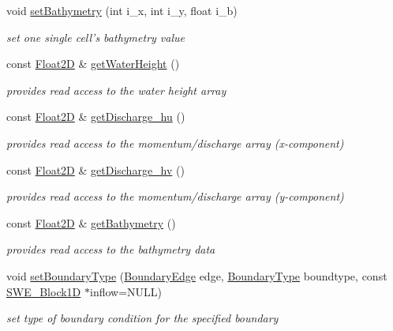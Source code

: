 \begin{DoxyCompactItemize}
void \hyperlink{classSWE__Block_a54d2adb939d59e064edd7316faae445f}{set\-Bathymetry} (int i\-\_\-x, int i\-\_\-y, float i\-\_\-b)
\begin{DoxyCompactList}\small\item\em set one single cell's bathymetry value \end{DoxyCompactList}\item 
const \hyperlink{classFloat2D}{Float2\-D} \& \hyperlink{classSWE__Block_ab1aea4294403c194180c3dc107339fd7}{get\-Water\-Height} ()
\begin{DoxyCompactList}\small\item\em provides read access to the water height array \end{DoxyCompactList}\item 
const \hyperlink{classFloat2D}{Float2\-D} \& \hyperlink{classSWE__Block_ae5e766626a1e3fee89625610e2c67f1f}{get\-Discharge\-\_\-hu} ()
\begin{DoxyCompactList}\small\item\em provides read access to the momentum/discharge array (x-\/component) \end{DoxyCompactList}\item 
const \hyperlink{classFloat2D}{Float2\-D} \& \hyperlink{classSWE__Block_aece9e8dc3f9b8ab27420e537c76daf7c}{get\-Discharge\-\_\-hv} ()
\begin{DoxyCompactList}\small\item\em provides read access to the momentum/discharge array (y-\/component) \end{DoxyCompactList}\item 
const \hyperlink{classFloat2D}{Float2\-D} \& \hyperlink{classSWE__Block_a98e2c99a335d11d09a1489d6873b5615}{get\-Bathymetry} ()
\begin{DoxyCompactList}\small\item\em provides read access to the bathymetry data \end{DoxyCompactList}\item 
void \hyperlink{classSWE__Block_aa220b93e43b10f56c72a44d7363645c1}{set\-Boundary\-Type} (\hyperlink{SWE__Scenario_8hh_aa5e01e3f7df312f7b9b0d02521141fcc}{Boundary\-Edge} edge, \hyperlink{SWE__Scenario_8hh_af75d5dd7322fa39ed0af4e7839e600f8}{Boundary\-Type} boundtype, const \hyperlink{structSWE__Block1D}{S\-W\-E\-\_\-\-Block1\-D} $\ast$inflow=N\-U\-L\-L)
\begin{DoxyCompactList}\small\item\em set type of boundary condition for the specified boundary \end{DoxyCompactList}\item 

\end{DoxyCompactItemize}
